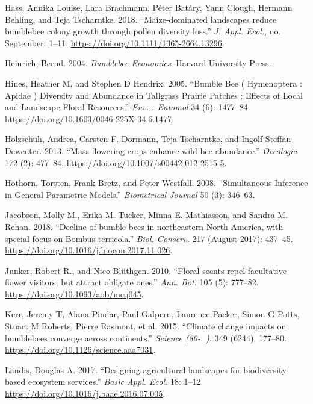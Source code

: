 \documentclass[11pt,]{article}
\begin{document}
\leavevmode\hypertarget{ref-Hass2018a}{}%
Hass, Annika Louise, Lara Brachmann, Péter Batáry, Yann Clough, Hermann
Behling, and Teja Tscharntke. 2018. ``Maize-dominated landscapes reduce
bumblebee colony growth through pollen diversity loss.'' \emph{J. Appl.
Ecol.}, no. September: 1--11.
\url{https://doi.org/10.1111/1365-2664.13296}.

\leavevmode\hypertarget{ref-Heinrich2004}{}%
Heinrich, Bernd. 2004. \emph{Bumblebee Economics}. Harvard University
Press.

\leavevmode\hypertarget{ref-Hines2005}{}%
Hines, Heather M, and Stephen D Hendrix. 2005. ``Bumble Bee (
Hymenoptera : Apidae ) Diversity and Abundance in Tallgrass Prairie
Patches : Effects of Local and Landscape Floral Resources.'' \emph{Env.
. Entomol} 34 (6): 1477--84.
\url{https://doi.org/10.1603/0046-225X-34.6.1477}.

\leavevmode\hypertarget{ref-Holzschuh2013}{}%
Holzschuh, Andrea, Carsten F. Dormann, Teja Tscharntke, and Ingolf
Steffan-Dewenter. 2013. ``Mass-flowering crops enhance wild bee
abundance.'' \emph{Oecologia} 172 (2): 477--84.
\url{https://doi.org/10.1007/s00442-012-2515-5}.

\leavevmode\hypertarget{ref-multcomp}{}%
Hothorn, Torsten, Frank Bretz, and Peter Westfall. 2008. ``Simultaneous
Inference in General Parametric Models.'' \emph{Biometrical Journal} 50
(3): 346--63.

\leavevmode\hypertarget{ref-Jacobson2018a}{}%
Jacobson, Molly M., Erika M. Tucker, Minna E. Mathiasson, and Sandra M.
Rehan. 2018. ``Decline of bumble bees in northeastern North America,
with special focus on Bombus terricola.'' \emph{Biol. Conserv.} 217
(August 2017): 437--45.
\url{https://doi.org/10.1016/j.biocon.2017.11.026}.

\leavevmode\hypertarget{ref-Junker2010}{}%
Junker, Robert R., and Nico Blüthgen. 2010. ``Floral scents repel
facultative flower visitors, but attract obligate ones.'' \emph{Ann.
Bot.} 105 (5): 777--82. \url{https://doi.org/10.1093/aob/mcq045}.

\leavevmode\hypertarget{ref-Kerr2015}{}%
Kerr, Jeremy T, Alana Pindar, Paul Galpern, Laurence Packer, Simon G
Potts, Stuart M Roberts, Pierre Rasmont, et al. 2015. ``Climate change
impacts on bumblebees converge across continents.'' \emph{Science (80-.
).} 349 (6244): 177--80. \url{https://doi.org/10.1126/science.aaa7031}.

\leavevmode\hypertarget{ref-Landis2017}{}%
Landis, Douglas A. 2017. ``Designing agricultural landscapes for
biodiversity-based ecosystem services.'' \emph{Basic Appl. Ecol.} 18:
1--12. \url{https://doi.org/10.1016/j.baae.2016.07.005}.
\end{document}
